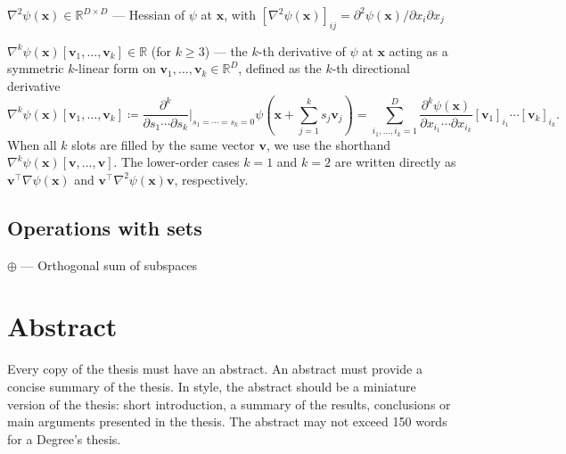 \documentclass[a4paper,12pt,openany]{book}
\newcommand{\R}{\mathbb{R}}
\renewcommand{\v}{\mathbf{v}}
\newcommand{\x}{\mathbf{x}}
\begin{document}
$\nabla^2 \psi(\x)\in\R^{D\times D}$ --- Hessian of $\psi$ at $\x$, with $[\nabla^2 \psi(\x)]_{ij} = \partial^2 \psi(\x)/\partial x_i\partial x_j$

$\nabla^k \psi(\x)[\v_1,\ldots,\v_k]\in\R$ (for $k\geq 3$) --- the $k$-th derivative of $\psi$ at $\x$ acting as a symmetric $k$-linear form on $\v_1,\ldots,\v_k\in\R^D$, defined as the $k$-th directional derivative
\begin{equation*}
	\nabla^k \psi(\x)[\v_1,\ldots,\v_k] \coloneqq \frac{\partial^k}{\partial s_1\cdots\partial s_k}\bigg|_{s_1=\cdots=s_k=0}\!\!\psi\!\left(\x + \sum_{j=1}^k s_j\v_j\right) = \!\!\sum_{i_1,\ldots,i_k=1}^D\!\frac{\partial^k\psi(\x)}{\partial x_{i_1}\cdots \partial x_{i_k}}[\v_1]_{i_1}\cdots[\v_k]_{i_k}.
\end{equation*}
When all $k$ slots are filled by the same vector $\v$, we use the shorthand $\nabla^k \psi(\x)[\v,\ldots,\v]$. The lower-order cases $k=1$ and $k=2$ are written directly as $\v^\top\nabla\psi(\x)$ and $\v^\top\nabla^2\psi(\x)\v$, respectively.

\subsection*{Operations with sets}

$\oplus$ --- Orthogonal sum of subspaces


\listoftables

\clearpage
\newpage
\section*{Abstract}

{Every copy of the thesis must have an abstract. An abstract must provide a concise summary of the thesis. In style, the
abstract should be a miniature version of the thesis: short introduction, a summary of the results, conclusions or main
arguments presented in the thesis. The abstract may not exceed 150 words for a Degree’s thesis.}



% 



%

%

%

%

%

%
\end{document}
